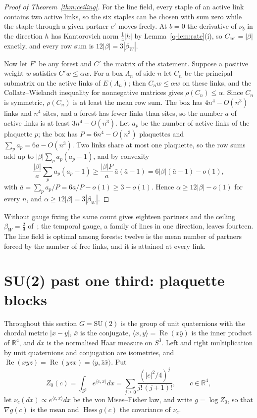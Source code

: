 \documentclass[aps,prd,twocolumn,superscriptaddress,nofootinbib,longbibliography,floatfix,amsmath,amssymb,10pt]{revtex4-2}
\theoremstyle{definition}
\theoremstyle{remark}
\newcommand{\R}{\mathbb{R}}
\newcommand{\SU}{\mathrm{SU}}
\newcommand{\Hess}{\operatorname{Hess}}
\newcommand{\ip}[2]{\langle #1,#2\rangle}
\begin{document}
\begin{proof}[Proof of Theorem~\ref{thm:ceiling}]
For the line field, every staple of an active link contains two active
links, so the six staples can be chosen with sum zero while the staple
through a given partner $e'$ moves freely. At $b=0$ the derivative of $\nu_b$
in the direction $h$ has Kantorovich norm $\frac14|h|$ by Lemma~\ref{q-lem:rate}(i),
so $C_{ee'}=|\beta|$ exactly, and every row sum is $12|\beta|=3|\beta_W|$.

Now let $F'$ be any forest and $C'$ the matrix of the statement. Suppose a
positive weight $w$ satisfies $C'w\le\alpha w$. For a box $\Lambda_n$ of side
$n$ let $C_n$ be the principal submatrix on the active links of $E(\Lambda_n)$;
then $C_nw\le\alpha w$ on these links, and the Collatz--Wielandt inequality
for nonnegative matrices gives $\rho(C_n)\le\alpha$. Since $C_n$ is symmetric,
$\rho(C_n)$ is at least the mean row sum. The box has $4n^4-O(n^3)$ links and
$n^4$ sites, and a forest has fewer links than sites, so the number $a$ of
active links is at least $3n^4-O(n^3)$. Let $a_p$ be the number of active
links of the plaquette $p$; the box has $P=6n^4-O(n^3)$ plaquettes and
$\sum_pa_p=6a-O(n^3)$. Two links share at most one plaquette, so the row
sums add up to $|\beta|\sum_pa_p(a_p-1)$, and by convexity
\[
\frac{|\beta|}a\sum_pa_p(a_p-1)\ge\frac{|\beta|P}a\,\bar a(\bar a-1)
=6|\beta|(\bar a-1)-o(1),
\]
with $\bar a=\sum_pa_p/P=6a/P-o(1)\ge3-o(1)$. Hence $\alpha\ge12|\beta|-o(1)$
for every $n$, and $\alpha\ge12|\beta|=3|\beta_W|$.
\end{proof}

Without gauge fixing the same count gives eighteen partners and the ceiling
$\beta_W=\frac29$ of~\cite[Prop.~13]{BB26a}; the temporal gauge, a family of
lines in one direction, leaves fourteen. The line field is optimal among
forests: twelve is the mean number of partners forced by the number of free
links, and it is attained at every link.

\section{SU(2) past one third: plaquette blocks}\label{sec:plaqblocks}

Throughout this section $G=\SU(2)$ is the group of unit quaternions with
the chordal metric $|x-y|$, $\bar x$ is the conjugate, $\ip xy=\operatorname{Re}
(x\bar y)$ is the inner product of $\R^4$, and $dx$ is the normalised Haar
measure on $S^3$. Left and right multiplication by unit quaternions and
conjugation are isometries, and $\operatorname{Re}(xyz)=\operatorname{Re}
(yzx)=\ip y{\bar z\bar x}$. Put
\[
Z_0(c)=\int_{S^3}e^{\ip cx}dx=\sum_{j\ge0}\frac{(|c|^2/4)^j}{j!\,(j+1)!},
\qquad c\in\R^4,
\]
let $\nu_c(dx)\propto e^{\ip cx}dx$ be the von Mises--Fisher law, and write
$g=\log Z_0$, so that $\nabla g(c)$ is the mean and $\Hess g(c)$ the
covariance of $\nu_c$.
\end{document}
